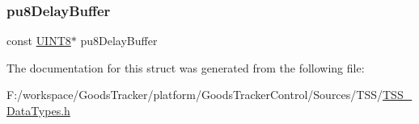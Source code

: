 \mbox{\label{struct_t_s_s___a_slider_context_a12a93ed2a418cbb140aa8306641509ae}} 
\subsubsection{\texorpdfstring{pu8\+Delay\+Buffer}{pu8DelayBuffer}}
{\footnotesize\ttfamily const \hyperlink{_t_s_s___data_types_8h_ab27e9918b538ce9d8ca692479b375b6a}{U\+I\+N\+T8}$\ast$ pu8\+Delay\+Buffer}



The documentation for this struct was generated from the following file\+:\begin{DoxyCompactItemize}
\item 
F\+:/workspace/\+Goods\+Tracker/platform/\+Goods\+Tracker\+Control/\+Sources/\+T\+S\+S/\hyperlink{_t_s_s___data_types_8h}{T\+S\+S\+\_\+\+Data\+Types.\+h}\end{DoxyCompactItemize}
